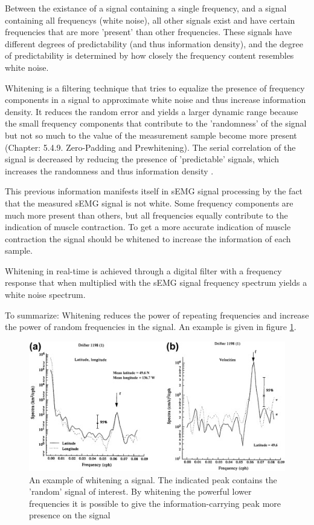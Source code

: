 Between the existance of a signal containing a single frequency, and a signal containing all frequencys (white noise), all other signals exist and have certain frequencies that are more 'present' than other frequencies. These signals have different degrees of predictability (and thus information density), and the degree of predictability is determined by how closely the frequency content resembles white noise.

Whitening is a filtering technique that tries to equalize the presence of frequency components in a signal to approximate white noise and thus increase information density. It reduces the random error and yields a larger dynamic range because the small frequency components that contribute to the 'randomness' of the signal but not so much to the value of the measurement sample become more present \cite{time_series_analysis_methods} (Chapter: 5.4.9. Zero-Padding and Prewhitening). The serial correlation of the signal is decreased by reducing the presence of 'predictable' signals, which increases the randomness and thus information density \cite{serial_correlation_definition}. 

This previous information manifests itself in sEMG signal processing by the fact that the measured sEMG signal is not white. Some frequency components are much more present than others, but all frequencies equally contribute to the indication of muscle contraction. To get a more accurate indication of muscle contraction the signal should be whitened to increase the information of each sample.

Whitening in real-time is achieved through a digital filter with a frequency response that when multiplied with the sEMG signal frequency spectrum yields a white noise spectrum.

To summarize: Whitening reduces the power of repeating frequencies and increase the power of random frequencies in the signal. An example is given in figure \ref{fig:whitening_example}.

\begin{figure}[h!t]
	\begin{center}
		\includegraphics[width=0.7\columnwidth]{images/prewhitening_example.jpg}
	\end{center}
	\caption{An example of whitening a signal. The indicated peak contains the 'random' signal of interest. By whitening the powerful lower frequencies it is possible to give the information-carrying peak more presence on the signal \cite{time_series_analysis_methods}}
	\label{fig:whitening_example}
\end{figure}


